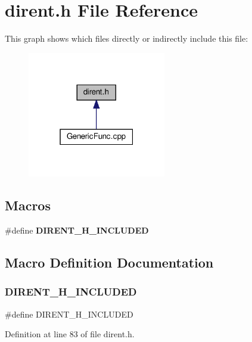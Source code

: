 \section{dirent.\+h File Reference}
\label{dirent_8h}
This graph shows which files directly or indirectly include this file\+:\nopagebreak
\begin{figure}[H]
\begin{center}
\leavevmode
\includegraphics[width=171pt]{dirent_8h__dep__incl}
\end{center}
\end{figure}
\subsection*{Macros}
\begin{DoxyCompactItemize}
\item 
\#define \textbf{ D\+I\+R\+E\+N\+T\+\_\+\+H\+\_\+\+I\+N\+C\+L\+U\+D\+ED}
\end{DoxyCompactItemize}


\subsection{Macro Definition Documentation}
\mbox{\label{dirent_8h_a4fa796460f38104052159df94e89d209}} 
\subsubsection{D\+I\+R\+E\+N\+T\+\_\+\+H\+\_\+\+I\+N\+C\+L\+U\+D\+ED}
{\footnotesize\ttfamily \#define D\+I\+R\+E\+N\+T\+\_\+\+H\+\_\+\+I\+N\+C\+L\+U\+D\+ED}



Definition at line 83 of file dirent.\+h.

